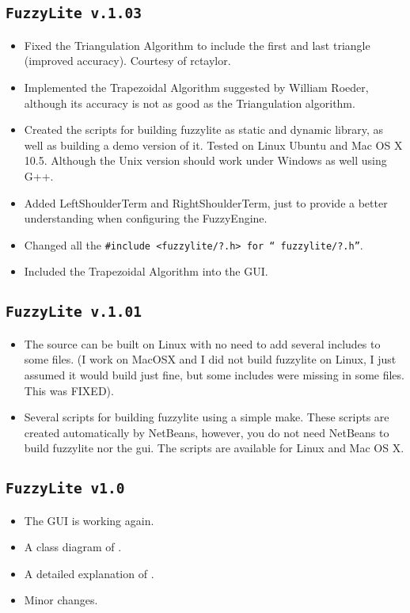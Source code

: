 	\subsection{\texttt{FuzzyLite v.1.03}}
	\begin{itemize} 
	  \item Fixed the Triangulation Algorithm to include the first and last
	  triangle (improved accuracy). Courtesy of rctaylor.
	  \item Implemented the Trapezoidal Algorithm suggested by William Roeder,
	  although its accuracy is not as good as the Triangulation algorithm.
	  \item Created the scripts for building fuzzylite as static and dynamic
	  library, as well as building a demo version of it. Tested on Linux Ubuntu and
	  Mac OS X 10.5. Although the Unix version should work under Windows as well
	  using G++.
	  \item Added LeftShoulderTerm and RightShoulderTerm, just to provide a better
	  understanding when configuring the FuzzyEngine.
	  \item Changed all the \texttt{\#include <fuzzylite/?.h> for ``
	  fuzzylite/?.h''}.
	  \item Included the Trapezoidal Algorithm into the GUI.
	\end{itemize}

	\subsection{\texttt{FuzzyLite v.1.01}}
	\begin{itemize}
		\item 	The source can be built on Linux with no need to add several includes to some files. (I work on MacOSX and I did not build fuzzylite on Linux, I just assumed it would build just fine, but some includes were missing in some files. This was FIXED).
	\item Several scripts for building fuzzylite using a simple make. These scripts are created automatically by NetBeans, however, you do not need NetBeans to build fuzzylite nor the gui. The scripts are available for Linux and Mac OS X.
	\end{itemize}
	
	\subsection{\texttt{FuzzyLite v1.0}}
	\begin{itemize}
		\item The GUI is working again.
		\item A class diagram of \fl.
		\item A detailed explanation of \fl.
		\item Minor changes.
	\end{itemize}

